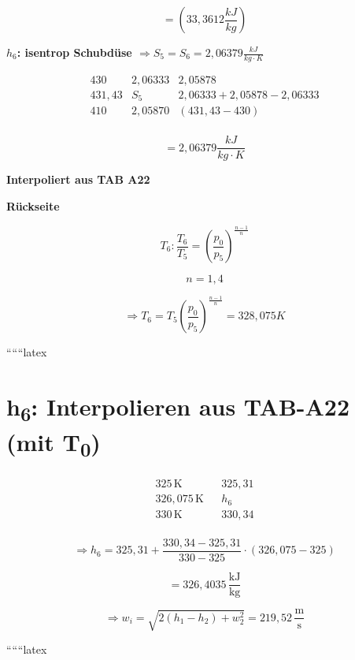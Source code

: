 \[
= (33,3612 \frac{kJ}{kg})
\]

\textbf{$h_6$: isentrop Schubdüse $\Rightarrow S_5 = S_6 = 2,06379 \frac{kJ}{kg \cdot K}$}

\[
\begin{array}{ccc}
430 & 2,06333 & 2,05878 \\
431,43 & S_5 & 2,06333 + 2,05878 - 2,06333 \\
410 & 2,05870 & (431,43 - 430) \\
\end{array}
\]

\[
= 2,06379 \frac{kJ}{kg \cdot K}
\]

\textbf{Interpoliert aus TAB A22}

\textbf{Rückseite}

\[
T_6: \frac{T_6}{T_5} = \left( \frac{p_0}{p_5} \right)^{\frac{n-1}{n}}
\]

\[
n = 1,4
\]

\[
\Rightarrow T_6 = T_5 \left( \frac{p_0}{p_5} \right)^{\frac{n-1}{n}} = 328,075 K
\]

``````latex


\section*{h\textsubscript{6}: Interpolieren aus TAB-A22 (mit T\textsubscript{0})}

\[
\begin{array}{cccc}
325 \, \text{K} & & 325,31 \\
326,075 \, \text{K} & & h_6 \\
330 \, \text{K} & & 330,34 \\
\end{array}
\]

\[
\Rightarrow h_6 = 325,31 + \frac{330,34 - 325,31}{330 - 325} \cdot (326,075 - 325)
\]

\[
= 326,4035 \, \frac{\text{kJ}}{\text{kg}}
\]

\[
\Rightarrow w_i = \sqrt{2(h_1 - h_2) + w_2^2} = 219,52 \, \frac{\text{m}}{\text{s}}
\]

``````latex


